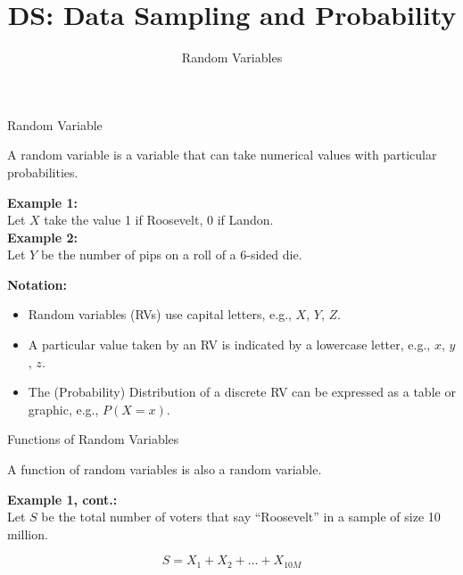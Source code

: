 \documentclass[aspectratio=169]{../latex_main/tntbeamer}  %
\title[Random Variables]{DS: Data Sampling and Probability}
\subtitle{Random Variables}
\begin{document}
	
	\maketitle
	

\begin{frame}{Random Variable}

    A random variable is a variable that can take numerical values with particular probabilities.\\
    \bigskip
    
    \textbf{Example 1:} \\
    Let $X$ take the value 1 if Roosevelt, 0 if Landon.\\

    \textbf{Example 2:} \\
    Let $Y$ be the number of pips on a roll of a 6-sided die.

    \textbf{Notation:}
    \begin{itemize}
        \item Random variables (RVs) use capital letters, e.g., $X$, $Y$, $Z$.
        \item A particular value taken by an RV is indicated by a lowercase letter, e.g., $x$, $y$, $z$.
        \item The (Probability) Distribution of a discrete RV can be expressed as a table or graphic, e.g., $P(X = x)$.
    \end{itemize}
    

\end{frame}

\begin{frame}{Functions of Random Variables}
    
    A function of random variables is also a random variable.
    \bigskip
    
    \textbf{Example 1, cont.:} \\
    Let $S$ be the total number of voters that say “Roosevelt” in a sample of size 10 million.

    \begin{equation}
    S = X_1 + X_2 + \dots + X_{10M}
    \end{equation}


\end{frame}
\end{document}
